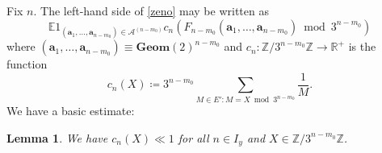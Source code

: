 \documentclass[12pt,a4paper,reqno]{amsart}
\numberwithin{equation}{section}
\theoremstyle{plain}
\newtheorem{lemma}[theorem]{Lemma}
\theoremstyle{definition}
\newcommand\E{\mathbb{E}}
\newcommand\R{\mathbb{R}}
\newcommand\Z{\mathbb{Z}}
\renewcommand\a{\mathbf{a}}
\newcommand\Geom{\mathbf{Geom}}
\renewcommand{\mod}{\bmod}
\begin{document}
Fix $n$.  The left-hand side of \eqref{zeno} may be written as
\begin{equation}\label{soda}
  \E 1_{(\a_1,\dots,\a_{n-m_0}) \in {\mathcal A}^{(n-m_0)}} c_n( F_{n-m_0}(\a_1,\dots,\a_{n-m_0}) \mod 3^{n-m_0} )
	\end{equation}
where $(\a_1,\dots,\a_{n-m_0})  \equiv \Geom(2)^{n-m_0}$ and $c_n\colon \Z/3^{n-m_0}\Z \to \R^+$ is the function
\begin{equation}\label{cn-def}
 c_n( X ) \coloneqq 3^{n-m_0} \sum_{M \in E': M = X \mod 3^{n-m_0}} \frac{1}{M}.
\end{equation}
We have a basic estimate:

\begin{lemma}\label{loam}  We have $c_n(X) \ll 1$ for all $n \in I_y$ and $X \in \Z/3^{n-m_0}\Z$.
\end{lemma}
\end{document}

